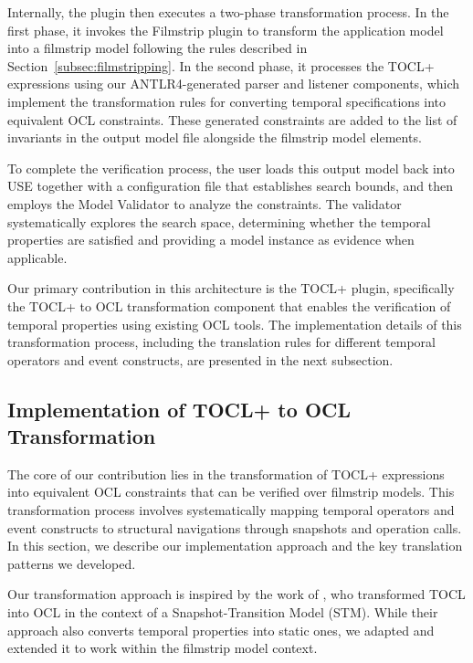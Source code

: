 Internally, the plugin then executes a two-phase transformation process. In the 
first phase, it invokes the Filmstrip plugin to transform the application model 
into a filmstrip model following the rules described in Section~\ref{subsec:filmstripping}. 
In the second phase, it processes the TOCL+ expressions using our ANTLR4-generated 
parser and listener components, which implement the transformation rules for 
converting temporal specifications into equivalent OCL constraints. These generated 
constraints are added to the list of invariants in the output model file alongside 
the filmstrip model elements.

To complete the verification process, the user loads this output model back into 
USE together with a configuration file that establishes search bounds, and then 
employs the Model Validator to analyze the constraints. The validator systematically 
explores the search space, determining whether the temporal properties are satisfied 
and providing a model instance as evidence when applicable.

Our primary contribution in this architecture is the TOCL+ plugin, specifically 
the TOCL+ to OCL transformation component that enables the verification of temporal 
properties using existing OCL tools. The implementation details of this transformation 
process, including the translation rules for different temporal operators and event 
constructs, are presented in the next subsection.

\subsection{Implementation of TOCL+ to OCL Transformation}

\hspace{1cm} The core of our contribution lies in the transformation of TOCL+ 
expressions into equivalent OCL constraints that can be verified over filmstrip 
models. This transformation process involves systematically mapping temporal operators 
and event constructs to structural navigations through snapshots and operation calls. 
In this section, we describe our implementation approach and the key translation 
patterns we developed.

Our transformation approach is inspired by the work of \cite{TOCL2OCL}, who 
transformed TOCL \cite{TOCL} into OCL in the context of a Snapshot-Transition Model 
(STM). While their approach also converts temporal properties into static ones, we 
adapted and extended it to work within the filmstrip model context.

